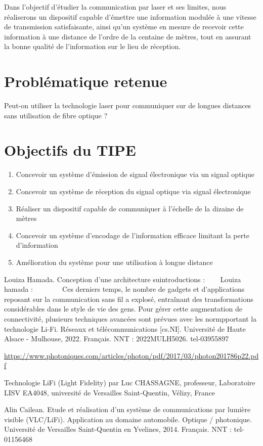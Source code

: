 \documentclass[french,titlepage]{extarticle}
\begin{document}
Dans l'objectif d'étudier la communication par laser et ses limites,
nous réaliserons un dispositif capable d'émettre une information modulée
à une vitesse de transmission satisfaisante, ainsi qu'un système en
mesure de recevoir cette information à une distance de l'ordre de
la centaine de mètres, tout en assurant la bonne qualité de l'information
sur le lieu de réception.

\section*{Problématique retenue}

Peut-on utiliser la technologie laser pour communiquer sur de longues
distances sans utilisation de fibre optique ?

\section*{Objectifs du TIPE}
\begin{enumerate}
\item Concevoir un système d'émission de signal électronique via un signal
optique
\item Concevoir un système de réception du signal optique via signal électronique
\item Réaliser un dispositif capable de communiquer à l'échelle de la dizaine
de mètres
\item Concevoir un système d'encodage de l'information efficace limitant
la perte d'information
\item Amélioration du système pour une utilisation à longue distance
\end{enumerate}
\begin{thebibliography}{1}
Louiza Hamada. Conception d\textquoteright une architecture
suintroductions :     Louiza hamada :         Ces derniers temps,
le nombre de gadgets et d'applications reposant sur la communication
sans fil a explosé, entraînant des transformations considérables dans
le style de vie des gens. Pour gérer cette augmentation de connectivité,
plusieurs techniques avancées sont prévues avec les normpportant la
technologie Li-Fi. Réseaux et télécommunications {[}cs.NI{]}. Université
de Haute Alsace - Mulhouse, 2022. Français. NNT : 2022MULH5026. tel-03955897

\href{https://www.photoniques.com/articles/photon/pdf/2017/03/photon201786p22.pdf}{https://www.photoniques.com/articles/photon/pdf/2017/03/photon201786p22.pdf}

Technologie LiFi (Light Fidelity) par Luc CHASSAGNE,
professeur, Laboratoire LISV EA4048, université de Versailles Saint-Quentin,
Vélizy, France

Alin Cailean. Etude et réalisation d\textquoteright un
système de communications par lumière visible (VLC/LiFi). Application
au domaine automobile. Optique / photonique. Université de Versailles
Saint-Quentin en Yvelines, 2014. Français. NNT : tel-01156468

\end{thebibliography}
\end{document}
